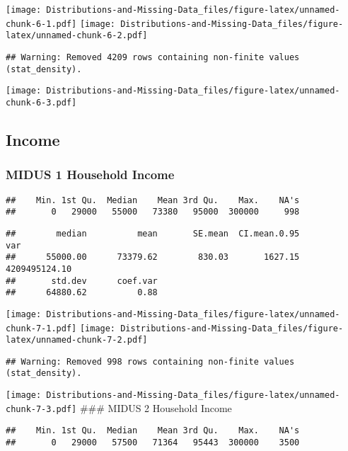 \documentclass[
]{article}
\begin{document}
\texttt{[image: Distributions-and-Missing-Data\_files/figure-latex/unnamed-chunk-6-1.pdf]}
\texttt{[image: Distributions-and-Missing-Data\_files/figure-latex/unnamed-chunk-6-2.pdf]}

\begin{verbatim}
## Warning: Removed 4209 rows containing non-finite values (stat_density).
\end{verbatim}

\texttt{[image: Distributions-and-Missing-Data\_files/figure-latex/unnamed-chunk-6-3.pdf]}

\hypertarget{income}{%
\subsection{Income}\label{income}}

\hypertarget{midus-1-household-income}{%
\subsubsection{MIDUS 1 Household
Income}\label{midus-1-household-income}}

\begin{verbatim}
##    Min. 1st Qu.  Median    Mean 3rd Qu.    Max.    NA's 
##       0   29000   55000   73380   95000  300000     998
\end{verbatim}

\begin{verbatim}
##        median          mean       SE.mean  CI.mean.0.95           var 
##      55000.00      73379.62        830.03       1627.15 4209495124.10 
##       std.dev      coef.var 
##      64880.62          0.88
\end{verbatim}

\texttt{[image: Distributions-and-Missing-Data\_files/figure-latex/unnamed-chunk-7-1.pdf]}
\texttt{[image: Distributions-and-Missing-Data\_files/figure-latex/unnamed-chunk-7-2.pdf]}

\begin{verbatim}
## Warning: Removed 998 rows containing non-finite values (stat_density).
\end{verbatim}

\texttt{[image: Distributions-and-Missing-Data\_files/figure-latex/unnamed-chunk-7-3.pdf]}
\#\#\# MIDUS 2 Household Income

\begin{verbatim}
##    Min. 1st Qu.  Median    Mean 3rd Qu.    Max.    NA's 
##       0   29000   57500   71364   95443  300000    3500
\end{verbatim}
\end{document}
